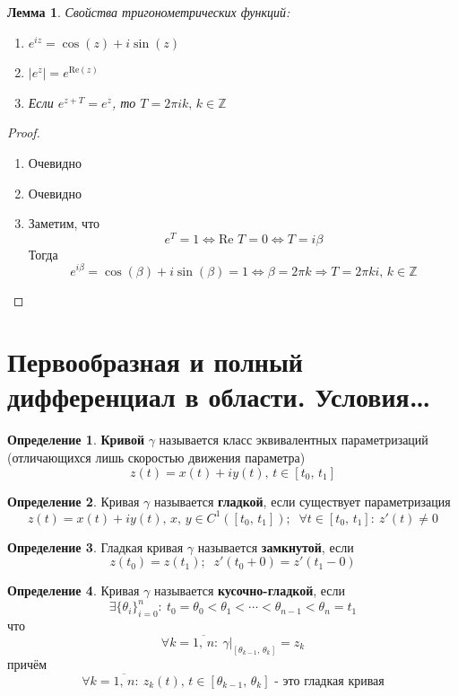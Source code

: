 \documentclass[a4paper,12pt]{article}
\theoremstyle{plain}
\newtheorem{lemma}{Лемма}[section]
\theoremstyle{definition}
\newtheorem{definition}{Определение}[section]
\theoremstyle{remark}
\begin{document}
\begin{lemma}
	Свойства тригонометрических функций:
	\begin{enumerate}
		\item $e^{iz} = \cos(z) + i\sin(z)$
		\item $\vert e^z\vert = e^{\text{Re}(z)}$
		\item Если $e^{z + T} = e^z$, то $T = 2\pi ik,\, k \in \mathbb{Z}$
	\end{enumerate}
\end{lemma}

\begin{proof}
	\begin{enumerate}
		\item Очевидно
		\item Очевидно
		\item Заметим, что
		      \[
			      e^T = 1 \Leftrightarrow \text{Re }T = 0 \Leftrightarrow T = i\beta
		      \]
		      Тогда
		      \[
			      e^{i\beta} = \cos(\beta) + i\sin(\beta) = 1 \Leftrightarrow \beta = 2\pi k \Rightarrow T = 2\pi ki,\, k \in \mathbb{Z}
		      \]
	\end{enumerate}
\end{proof}

\section{Первообразная и полный дифференциал в области. Условия\dots}
\begin{definition}
	\textbf{Кривой} $\gamma$ называется класс эквивалентных параметризаций (отличающихся лишь скоростью движения параметра)
	\[
		z(t) = x(t) + iy(t),\, t \in [t_0,\, t_1]
	\]
\end{definition}

\begin{definition}
	Кривая $\gamma$ называется \textbf{гладкой}, если существует параметризация
	\[
		z(t) = x(t) + iy(t),\, x,\, y \in C^1([t_0,\, t_1]);\;\; \forall t \in [t_0,\, t_1] :\: z'(t) \neq 0
	\]
\end{definition}

\begin{definition}
	Гладкая кривая $\gamma$ называется \textbf{замкнутой}, если
	\[
		z(t_0) = z(t_1);\;\; z'(t_0 + 0) = z'(t_1 - 0)
	\]
\end{definition}

\begin{definition}
	Кривая $\gamma$ называется \textbf{кусочно-гладкой}, если
	\[
		\exists\{\theta_i\}_{i = 0}^n :\: t_0 = \theta_0 < \theta_1 < \cdots < \theta_{n - 1} < \theta_n = t_1
	\]
	что 
	\[
		\forall k = \overline{1,\,n} :\: \gamma|_{[\theta_{k - 1},\, \theta_k]} = z_k
	\]
	причём
	\[
		\forall k = \overline{1,\,n} :\: z_k(t),\, t \in [\theta_{k-1},\, \theta_k] \text{ - это гладкая кривая}
	\]
\end{definition}
\end{document}
